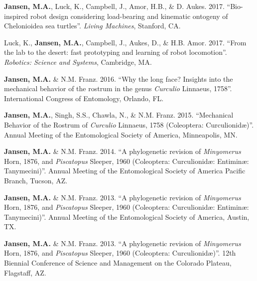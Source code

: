 \documentclass[12pt,a4paper]{article}
\begin{document}
\begin{description}
		\item \textbf{Jansen, M.A.}, Luck, K., Campbell, J., Amor, H.B., \& D. Aukes. 2017. ``Bio-inspired robot design considering load-bearing and kinematic ontogeny of Chelonioidea sea turtles''. \textit{Living Machines}, Stanford, CA.
		\item Luck, K., \textbf{Jansen, M.A.}, Campbell, J., Aukes, D., \& H.B. Amor. 2017. ``From the lab to the desert: fast prototyping and learning of robot locomotion''. \textit{Robotics: Science and Systems}, Cambridge, MA.
		\item \textbf{Jansen, M.A.} \& N.M. Franz. 2016. ``Why the long face? Insights into the mechanical behavior of the rostrum in the genus \textit{Curculio} Linnaeus, 1758''. International Congress of Entomology, Orlando, FL.
		\item \textbf{Jansen, M.A.}, Singh, S.S., Chawla, N., \& N.M. Franz. 2015. ``Mechanical Behavior of the Rostrum of \textit{Curculio} Linnaeus, 1758 (Coleoptera: Curculionid\ae)''. Annual Meeting of the Entomological Society of America, Minneapolis, MN.
		\item \textbf{Jansen, M.A.} \& N.M. Franz. 2014. ``A phylogenetic revision of \textit{Minyomerus} Horn, 1876, and \textit{Piscatopus} Sleeper, 1960 (Coleoptera: Curculionid\ae: Entimin\ae: Tanymecini)''. Annual Meeting of the Entomological Society of America Pacific Branch, Tucson, AZ.
		\item \textbf{Jansen, M.A.} \& N.M. Franz. 2013. ``A phylogenetic revision of \textit{Minyomerus} Horn, 1876, and \textit{Piscatopus} Sleeper, 1960 (Coleoptera: Curculionid\ae: Entimin\ae: Tanymecini)''. Annual Meeting of the Entomological Society of America, Austin, TX.
		\item \textbf{Jansen, M.A.} \& N.M. Franz. 2013. ``A phylogenetic revision of \textit{Minyomerus} Horn, 1876, and \textit{Piscatopus} Sleeper, 1960 (Coleoptera: Curculionid\ae)''. 12th Biennial Conference of Science and Management on the Colorado Plateau, Flagstaff, AZ.
	\end{description}
\end{document}
